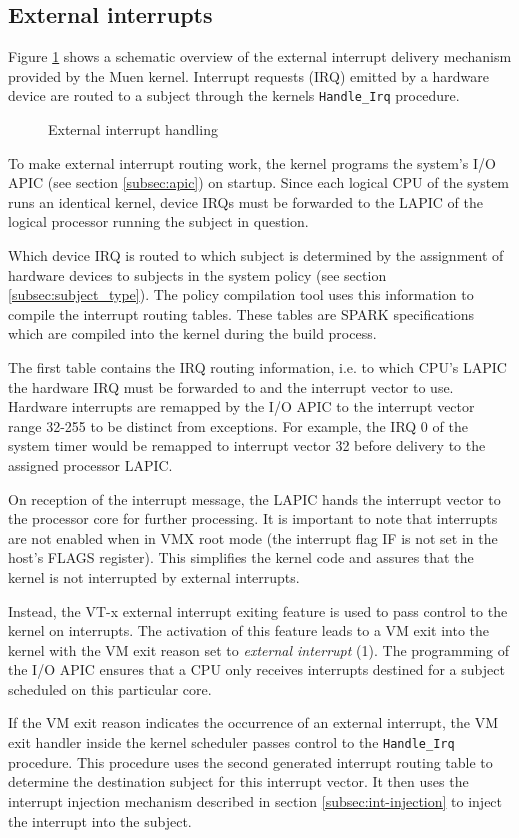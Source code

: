 \subsection{External interrupts}\label{subsec:external-ints}
Figure \ref{fig:external-interrupt} shows a schematic overview of the external
interrupt delivery mechanism provided by the Muen kernel. Interrupt requests
(IRQ) emitted by a hardware device are routed to a subject through
the kernels \texttt{Handle\_Irq} procedure.

\begin{figure}[h]
	\centering
	
	\caption{External interrupt handling}
	\label{fig:external-interrupt}
\end{figure}

To make external interrupt routing work, the kernel programs the system's I/O
APIC (see section \ref{subsec:apic}) on startup. Since each logical CPU of the
system runs an identical kernel, device IRQs must be forwarded to the LAPIC of
the logical processor running the subject in question.

Which device IRQ is routed to which subject is determined by the assignment of
hardware devices to subjects in the system policy (see section
\ref{subsec:subject_type}). The policy compilation tool uses this information to
compile the interrupt routing tables. These tables are SPARK specifications
which are compiled into the kernel during the build process.

The first table contains the IRQ routing information, i.e. to which CPU's LAPIC
the hardware IRQ must be forwarded to and the interrupt vector to use. Hardware
interrupts are remapped by the I/O APIC to the interrupt vector range 32-255 to
be distinct from exceptions. For example, the IRQ 0 of the system timer would
be remapped to interrupt vector 32 before delivery to the assigned processor
LAPIC.

On reception of the interrupt message, the LAPIC hands the interrupt vector to
the processor core for further processing. It is important to note that
interrupts are not enabled when in VMX root mode (the interrupt flag
IF is not set in the host's FLAGS register). This simplifies the
kernel code and assures that the kernel is not interrupted by external
interrupts.

Instead, the VT-x external interrupt exiting feature is used to pass control to
the kernel on interrupts. The activation of this feature leads to a VM exit
into the kernel with the VM exit reason set to \emph{external interrupt} (1).
The programming of the I/O APIC ensures that a CPU only receives interrupts
destined for a subject scheduled on this particular core.

If the VM exit reason indicates the occurrence of an external interrupt, the VM
exit handler inside the kernel scheduler passes control to the
\texttt{Handle\_Irq} procedure. This procedure uses the second generated
interrupt routing table to determine the destination subject for this interrupt
vector.  It then uses the interrupt injection mechanism described in section
\ref{subsec:int-injection} to inject the interrupt into the subject.
